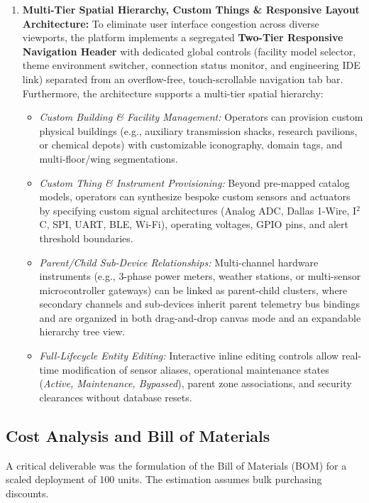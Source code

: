 \documentclass[12pt,a4paper]{article}
\begin{document}
\begin{enumerate}
    \item \textbf{Multi-Tier Spatial Hierarchy, Custom Things \& Responsive Layout Architecture:} To eliminate user interface congestion across diverse viewports, the platform implements a segregated \textbf{Two-Tier Responsive Navigation Header} with dedicated global controls (facility model selector, theme environment switcher, connection status monitor, and engineering IDE link) separated from an overflow-free, touch-scrollable navigation tab bar. Furthermore, the architecture supports a multi-tier spatial hierarchy:
    \begin{itemize}
        \item \textit{Custom Building \& Facility Management:} Operators can provision custom physical buildings (e.g., auxiliary transmission shacks, research pavilions, or chemical depots) with customizable iconography, domain tags, and multi-floor/wing segmentations.
        \item \textit{Custom Thing \& Instrument Provisioning:} Beyond pre-mapped catalog models, operators can synthesize bespoke custom sensors and actuators by specifying custom signal architectures (Analog ADC, Dallas 1-Wire, I$^2$C, SPI, UART, BLE, Wi-Fi), operating voltages, GPIO pins, and alert threshold boundaries.
        \item \textit{Parent/Child Sub-Device Relationships:} Multi-channel hardware instruments (e.g., 3-phase power meters, weather stations, or multi-sensor microcontroller gateways) can be linked as parent-child clusters, where secondary channels and sub-devices inherit parent telemetry bus bindings and are organized in both drag-and-drop canvas mode and an expandable hierarchy tree view.
        \item \textit{Full-Lifecycle Entity Editing:} Interactive inline editing controls allow real-time modification of sensor aliases, operational maintenance states (\textit{Active, Maintenance, Bypassed}), parent zone associations, and security clearances without database resets.
    \end{itemize}
\end{enumerate}

\subsection{Cost Analysis and Bill of Materials}
A critical deliverable was the formulation of the Bill of Materials (BOM) for a scaled deployment of 100 units. The estimation assumes bulk purchasing discounts. 
\end{document}
